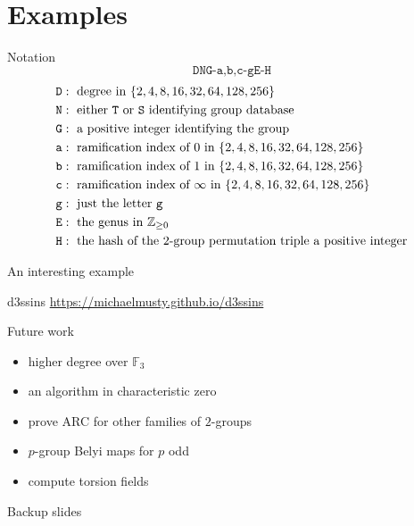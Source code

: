 \documentclass[xcolor=dvipsnames]{beamer}
\theoremstyle{plain}
\newcommand{\ZZ}{\mathbb Z}
\newcommand{\FF}{\mathbb{F}}
\begin{document}
  \section{Examples}{
    \begin{frame}{Notation}
      \begin{equation*}
        \texttt{DNG-a,b,c-gE-H}
      \end{equation*}
      \begin{align*}
        \texttt{D} &:\text{ degree in }
        \{2,4,8,16,32,64,128,256\}\\
        \texttt{N} &:\text{ either \texttt{T}
        or \texttt{S} identifying group
        database}\\
        \texttt{G} &:\text{ a positive integer
        identifying the group}\\
        \texttt{a} &:\text{ ramification index
        of $0$ in }
        \{2,4,8,16,32,64,128,256\}\\
        \texttt{b} &:\text{ ramification index
        of $1$ in }
        \{2,4,8,16,32,64,128,256\}\\
        \texttt{c} &:\text{ ramification index
        of $\infty$ in }
        \{2,4,8,16,32,64,128,256\}\\
        \texttt{g} &:\text{ just the letter 
        \texttt{g}}\\
        \texttt{E} &:\text{ the genus in }
        \ZZ_{\geq 0}\\
        \texttt{H} &:\text{ the hash
        of the $2$-group permutation triple 
        a positive integer}
      \end{align*}
    \end{frame}
    \begin{frame}{An interesting example}
    \end{frame}
    \begin{frame}{d3ssins}
        \url{https://michaelmusty.github.io/d3ssins}
    \end{frame}
  }
  \begin{frame}{Future work}
    \begin{itemize}
      \item
        higher degree over $\FF_3$
      \item
        an algorithm in characteristic zero
      \item
        prove ARC for other families of $2$-groups
      \item
        $p$-group Belyi maps for $p$ odd
      \item
        compute torsion fields
    \end{itemize}
  \end{frame}
  \appendix
  \begin{frame}{Backup slides}
  \end{frame}
\end{document}
